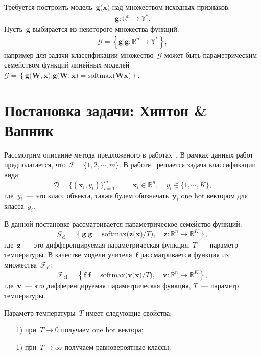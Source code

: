 \documentclass[12pt, twoside]{article}
\begin{document}
Требуется построить модель~$\mathbf{g}\bigr(\mathbf{x}\bigr)$ над множеством исходных признаков:
\[
\label{eq:st:5}
\begin{aligned}
\mathbf{g}:\mathbb{R}^{n} \to \mathbb{Y}^*.
\end{aligned}
\]
Пусть~$\mathbf{g}$ выбирается из некоторого множества функций:
\[
\label{eq:st:G}
\begin{aligned}
\mathcal{G} = \left\{\mathbf{g}| \mathbf{g}:\mathbb{R}^{n} \to \mathbb{Y}^*\right\},
\end{aligned}
\]
например для задачи классификации множество~$\mathcal{G}$ может быть параметрическим семейством функций линейных моделей $\mathcal{G} = \left\{\mathbf{g}\bigr(\mathbf{W}, \mathbf{x}\bigr)| \mathbf{g}\bigr(\mathbf{W}, \mathbf{x}\bigr) = \text{softmax}\bigr(\mathbf{W}\mathbf{x}\bigr)\right\}.$

\section{Постановка задачи: Хинтон \& Вапник}\label{state:hinton}
Рассмотрим описание метода предложеного в работах~\cite{Hinton2015, Lopez2016}. В рамках данных работ предполагается, что~$\mathcal{I} = \{1, 2, \cdots, m\}$. В работе~\cite{Hinton2015} решается задача классификации вида:
\[
    \mathcal{D} = \{\left(\mathbf{x}_i, y_i\right)\}_{i=1}^{m}, \qquad \mathbf{x}_i \in \mathbb{R}^{n}, \quad y_i \in \{1, \cdots, K\},
\]
где~$y_i$~--- это класс объекта, также будем обозначать~$\mathbf{y}_i$ one hot вектором для класса~$y_i$.

В данной постановке рассматривается параметрическое семейство функций:
\[
\label{eq:G:set:cl}
\mathcal{G}_{\text{cl}} = \left\{\mathbf{g}| \mathbf{g} = \text{softmax}\bigr(\mathbf{z}\bigr(\mathbf{x}\bigr)/T\bigr), \quad \mathbf{z}: \mathbb{R}^n \to \mathbb{R}^K \right\},
\]
где~$\mathbf{z}$~--- это дифференцируемая параметрическая функция, $T$~--- параметр температуры. В качестве модели учителя~$\mathbf{f}$ рассматривается функция из множества~$\mathcal{F}_{\text{cl}}$:
\[
\label{eq:F:set:cl}
\mathcal{F}_{\text{cl}} = \left\{\mathbf{f}| \mathbf{f} = \text{softmax}\bigr(\mathbf{v}\bigr(\mathbf{x}\bigr)/T\bigr), \quad \mathbf{v}: \mathbb{R}^n \to \mathbb{R}^K \right\},
\]
где~$\mathbf{v}$~--- это дифференцируемая параметрическая функция, $T$~--- параметр температуры. 

Параметр температуры~$T$ имеет следующие свойства:
\begin{enumerate}
    \item[1)] при~$T\to 0$ получаем one hot вектора;
    \item[1)] при~$T\to \infty$ получаем равновероятные классы.
\end{enumerate}
\end{document}
